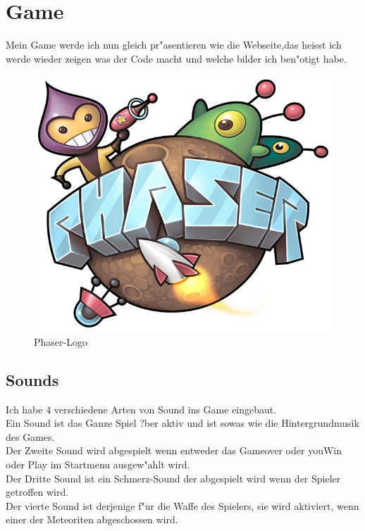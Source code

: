 \documentclass{article}
\begin{document}
\cleardoublepage


























































\section{Game}
Mein Game werde ich nun gleich pr"asentieren wie die Webseite,das heisst ich werde wieder zeigen was der Code macht und welche bilder ich ben"otigt habe.
\begin{figure}[ht]
    \centering
    \includegraphics[width=.5\linewidth]{phaser}
    \caption{Phaser-Logo}
    \label{fig:sub1}
    \end{figure}


    \subsection{Sounds}
    Ich habe 4 verschiedene Arten von Sound ins Game eingebaut.\\
    Ein Sound ist das Ganze Spiel ?ber aktiv und ist sowas wie die Hintergrundmusik des Games.\\
    Der Zweite Sound wird abgespielt wenn entweder das Gameover oder youWin oder Play im Startmenu ausgew"ahlt wird.\\
    Der Dritte Sound ist ein Schmerz-Sound der abgespielt wird wenn der Spieler getroffen wird.\\
    Der vierte Sound ist derjenige f"ur die Waffe des Spielers, sie wird aktiviert, wenn einer der Meteoriten abgeschossen wird.\\
\end{document}
